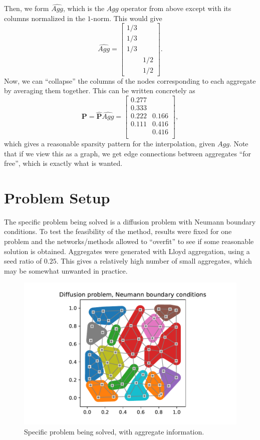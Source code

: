 \documentclass{article}
\newcommand{\mat}[1]{\bm{{#1}}}
\newcommand{\sfrac}[2]{#1/#2}
\begin{document}
Then, we form $\hat{Agg}$, which is the $Agg$ operator from above except with its columns normalized in the $1$-norm.  This would give
\begin{equation}
\hat{Agg} =
\begin{bmatrix}
  \sfrac{1}{3} & \\
  \sfrac{1}{3} & \\
  \sfrac{1}{3} & \\
  & \sfrac{1}{2} \\
  & \sfrac{1}{2}
\end{bmatrix}.
\end{equation}
Now, we can ``collapse'' the columns of the nodes corresponding to each aggregate by averaging them together.  This can be written concretely as
\begin{equation}
\mat{P} = \mat{\hat{P}}\hat{Agg} = \begin{bmatrix}
  0.277 & \\
  0.333 & \\
  0.222 & 0.166 \\
  0.111 & 0.416 \\
  & 0.416 \\
\end{bmatrix},
\end{equation}
which gives a reasonable sparsity pattern for the interpolation, given $Agg$.  Note that if we view this as a graph, we get edge connections between aggregates ``for free'', which is exactly what is wanted.

\section{Problem Setup}
The specific problem being solved is a diffusion problem with Neumann boundary conditions.  To test the feasibility of the method, results were fixed for one problem and the networks/methods allowed to ``overfit'' to see if some reasonable solution is obtained.  Aggregates were generated with Lloyd aggregation, using a seed ratio of $0.25$.  This gives a relatively high number of small aggregates, which may be somewhat unwanted in practice.

\begin{figure}[h]
  \includegraphics[width=\textwidth]{figures/diffusion-lloyd-aggregates.pdf}
  \caption{Specific problem being solved, with aggregate information.}
  \label{fig:lloyd_aggregates}
\end{figure}
\end{document}
